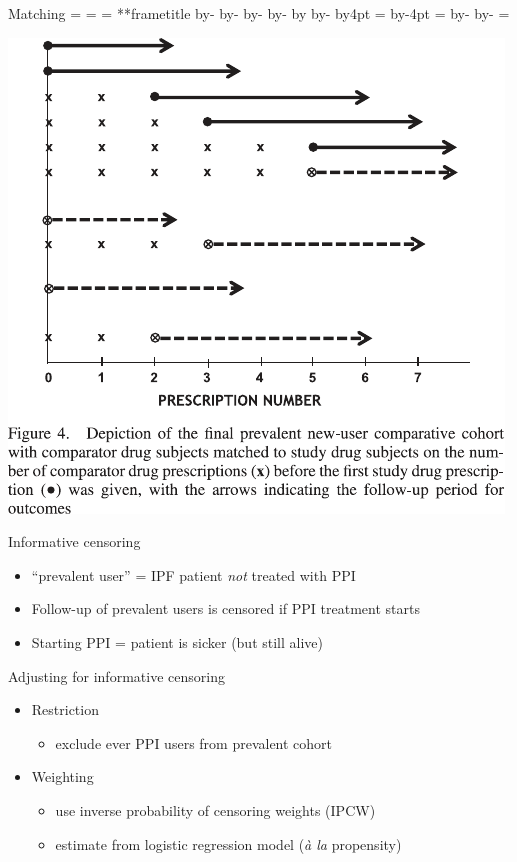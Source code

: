 \documentclass[aspectratio=169,12pt]{beamer} %
\makeatletter
\newif\ifsidebartheme
\newcommand*{\calculatespace}{%
    \contentheight=\paperheight%
    \ifx\beamer@frametitle\@empty%
        \setbox\@tempboxa=\box\voidb@x%
      \else%
        \setbox\@tempboxa=\vbox{%
          \vbox{}%
          {\parskip0pt\usebeamertemplate***{frametitle}}%
        }%
        \ifsidebartheme%
          \advance\contentheight by-1em%
        \fi%
      \fi%
    \advance\contentheight by-\ht\@tempboxa%
    \advance\contentheight by-\dp\@tempboxa%
    \advance\contentheight by-\beamer@frametopskip%
    \ifbeamer@plainframe%
    \contentbottom=0pt%
    \else%
    \advance\contentheight by-\headheight%
    \advance\contentheight by\headdp%
    \advance\contentheight by-\footheight%
    \advance\contentheight by4pt%
    \contentbottom=\footheight%
    \advance\contentbottom by-4pt%
    \fi%
    \contentwidth=\paperwidth%
    \ifbeamer@plainframe%
    \contentleft=0pt%
    \else%
    \advance\contentwidth by-\beamer@rightsidebar%
    \advance\contentwidth by-\beamer@leftsidebar\relax%
    \contentleft=\beamer@leftsidebar%
    \fi%
}
\makeatother
\begin{document}
\begin{frame}{Matching}
    \calculatespace%
    \begin{center}
	\includegraphics[height=0.85\contentheight]{ref/suimoodell-fig4.pdf}
    \end{center}
\end{frame}

\begin{frame}{Informative censoring}
    \begin{itemize}
	\item ``prevalent user'' = IPF patient \emph{not} treated with PPI
	\item Follow-up of prevalent users is censored if PPI treatment starts
	\item Starting PPI = patient is sicker (but still alive)
    \end{itemize}
\end{frame}

\begin{frame}{Adjusting for informative censoring}
    \begin{itemize}
	\item Restriction
	\begin{itemize}
	    \item exclude ever PPI users from prevalent cohort
	\end{itemize}
	\item Weighting
	\begin{itemize}
	    \item use inverse probability of censoring weights (IPCW)
	    \item estimate from logistic regression model (\emph{\`{a} la} propensity)
	\end{itemize}
    \end{itemize}
\end{frame}
\end{document}
